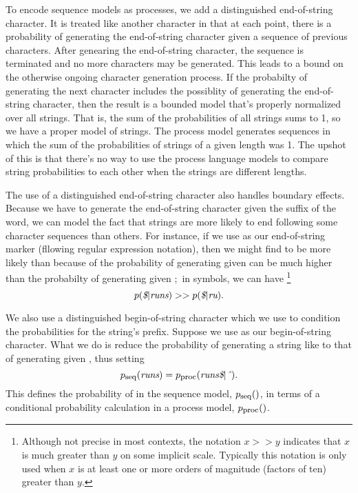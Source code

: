 To encode sequence models as processes, we add a distinguished
end-of-string character.  It is treated like another character in that
at each point, there is a probability of generating the end-of-string
character given a sequence of previous characters.  After genearing
the end-of-string character, the sequence is terminated and no more
characters may be generated.  This leads to a bound on the otherwise
ongoing character generation process.  If the probabilty of generating
the next character includes the possiblity of generating the
end-of-string character, then the result is a bounded model that's
properly normalized over all strings.  That is, the sum of the
probabilities of all strings sums to 1, so we have a proper model of
strings.  The process model generates sequences in which the sum of
the probabilities of strings of a given length was 1.  The upshot of
this is that there's no way to use the process language models to
compare string probabilities to each other when the strings are
different lengths.

The use of a distinguished end-of-string character also handles
boundary effects.  Because we have to generate the end-of-string
character given the suffix of the word, we can model the fact that
strings are more likely to end following some character sequences than
others.  For instance, if we use \charmention{\$} as our end-of-string
marker (fllowing regular expression notation), then we might find
 to be more likely than 
because of the probability of generating \charmention{\$} given
 can be much higher than the probabilty of
generating \charmention{\$} given ;\ in symbols, we
can have%
%
\footnote{Although not precise in most contexts, the notation $x >> y$
  indicates that $x$ is much greater than $y$ on some implicit scale.
  Typically this notation is only used when $x$ is at least one or
  more orders of magnitude (factors of ten) greater than $y$.}
%
\begin{equation}
p(\mbox{\it \$}|\mbox{\it runs}) >> p(\mbox{\it \$}|\mbox{\it ru}).
\end{equation}

We also use a distinguished begin-of-string character which
we use to condition the probabilities for the string's prefix.
Suppose we use \charmention{{\^{}}} as our begin-of-string character.
What we do is reduce the probability of generating a string
like  to that of generating 
 given \charmention{\^{}}, thus setting
%
\begin{equation}
p_{\mbox{\footnotesize seq}}(\mbox{\it runs})
= p_{\mbox{\footnotesize proc}}(\mbox{\it runs\$}|\mbox{\it \^{}}).
\end{equation}
%
This defines the probability of  in the
sequence model, $p_{\mbox{\footnotesize seq}}()$, in terms of
a conditional probability calculation in a process model,
$p_{\mbox{\footnotesize proc}}()$.

